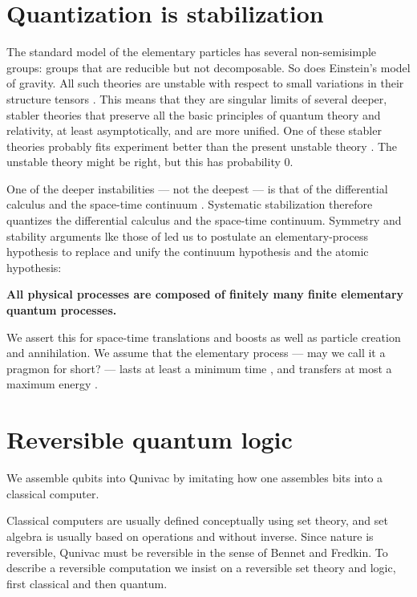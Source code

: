 \documentclass[a4paper,11pt]{article}
\begin{document}
\section{Quantization is stabilization}

The standard model of the
elementary particles has several non-semisimple groups:
groups that are reducible but not decomposable.
So does Einstein's 
model of gravity.
All such theories are unstable
with respect to small
variations in their
structure tensors
\cite{SEGAL, INONU}.
This means that they are
singular limits of 
several deeper,
stabler theories
that  preserve all
the basic principles 
of quantum theory and
relativity,
at least asymptotically, and
are more unified.
One of these stabler theories
probably fits experiment better
than the present unstable theory
\cite{SEGAL}.
The unstable theory might be right, 
but this
has probability 0.

One of the deeper instabilities
--- not the deepest ---
is that of the 
differential calculus
and the space-time continuum
\cite{SEGAL}.
Systematic stabilization therefore
quantizes the differential calculus
and the space-time continuum.
Symmetry and stability arguments
lke those of \cite{SEGAL}
 led us to postulate 
an
elementary-process hypothesis
to replace and unify
the continuum hypothesis 
and the atomic hypothesis:

{\large \bf 
All physical processes
are composed of finitely many finite
elementary quantum processes.
\cite{FINKELSTEIN1969,WHEELER,FINKELSTEIN1996}}

We assert this for space-time translations and boosts
as well 
as particle creation and annihilation.
We assume that the elementary process
--- may we call it a pragmon for short? ---
lasts at least a minimum time \myHighlight{$\Delta \tau$}\coordHE{},
and 
transfers at most a maximum energy \myHighlight{$\Delta \epsilon$}\coordHE{}.

\section{Reversible quantum logic}

We assemble qubits into  Qunivac
by imitating how one assembles bits into a classical
computer.

Classical computers are usually defined conceptually 
using set theory,
and set algebra is usually based on operations
\myHighlight{$\cup$}\coordHE{} and \myHighlight{$\cap$}\coordHE{}
without inverse.
Since nature is reversible, Qunivac must be
reversible in the sense of Bennet and Fredkin.
To describe a reversible computation
we insist on a reversible set theory and  logic,
first classical and then quantum.
\end{document}
